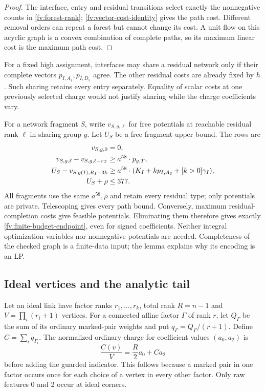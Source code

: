 \begin{proof}
The interface, entry and residual transitions select exactly the
nonnegative counts in \eqref{fv:forest-rank};
\eqref{fv:vector-cost-identity} gives the path cost. Different removal
orders can repeat a forest but cannot change its cost. A unit flow on
this acyclic graph is a convex combination of complete paths, so its
maximum linear cost is the maximum path cost.
\end{proof}

For a fixed high assignment, interfaces may share a residual network
only if their complete vectors $p_{I,A_4},p_{I,D_5}$ agree. The other
residual costs are already fixed by $h$. Such sharing retains every
entry separately. Equality of scalar costs at one previously selected
charge would not justify sharing while the charge coefficients vary.

For a network fragment $S$, write $v_{S,g,\ell}$ for free potentials
at reachable residual rank $\ell$ in sharing group $g$. Let $U_S$ be a
free fragment upper bound. The rows are
\begin{align}
 v_{S,g,0}&=0,\notag\\
 v_{S,g,\ell}-v_{S,g,\ell-r_T}
                  &\ge a^{58}\cdot p_{g,T},\notag\\
 U_S-v_{S,g(I),R_I-3k}
                  &\ge a^{58}\cdot(K_I+kp_{I,A_3}+[k>0]\gamma_I),
                  \label{fv:network-lp}\\
 U_S+\rho&\le377.\notag
\end{align}
All fragments use the same $a^{58},\rho$ and retain every residual
type; only potentials are private. Telescoping gives every path bound.
Conversely, maximum residual-completion costs give feasible potentials.
Eliminating them therefore gives exactly
\eqref{fv:finite-budget-endpoint}, even for signed coefficients.
Neither integral optimization variables nor nonnegative potentials
are needed. Completeness of the checked graph is a finite-data input;
the lemma explains why its encoding is an LP.

\subsection{Ideal vertices and the analytic tail}
\label{fv:ideal-block}

Let an ideal link have factor ranks
$r_1,\ldots,r_k$, total rank $R=n-1$ and $V=\prod_i(r_i+1)$ vertices.
For a connected affine factor $\Gamma$ of rank $r$, let $Q_\Gamma$
be the sum of its ordinary marked-pair weights and put
$q_\Gamma=Q_\Gamma/(r+1)$. Define $C=\sum_iq_{\Gamma_i}$.
The normalized ordinary charge for coefficient values $(a_0,a_2)$ is
\begin{equation}\label{fv:ideal-charge}
              \frac{C(v)}{V}=\frac R2a_0+Ca_2
\end{equation}
before adding the guarded indicator. This follows because a marked
pair in one factor occurs once for each choice of a vertex in every
other factor. Only raw features 0 and 2 occur at ideal corners.

